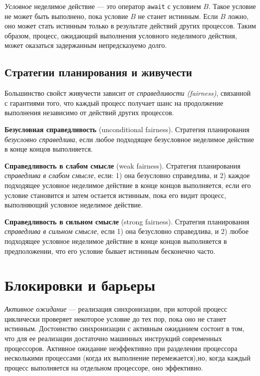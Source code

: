 \emph{Условное} неделимое действие --- это оператор \texttt{await} с условием
$B$. Такое условие не может быть выполнено, пока условие $B$ не станет
истинным. Если $B$ ложно, оно может стать истинным только в результате действий
других процессов. Таким образом, процесс, ожидающий выполнения условного
неделимого действия, может оказаться задержанным непредсказуемо долго.



\subsection{Стратегии планирования и живучести}

Большинство свойст живучести зависит от \emph{справедливости (fairness)},
связанной с гарантиями того, что каждый процесс получает шанс на продолжение
выполнения независимо от действий других процессов.

\textbf{Безусловная справедливость} (unconditional fairness). Стратегия
планирования \emph{безусловно справедлива}, если любое подходящее безусловное
неделимое действие в конце концов выполняется.

\textbf{Справедливость в слабом смысле} (weak fairness). Стратегия планирования
\emph{справедлива в слабом смысле}, если: 1) она безусловно справедлива, и
2) каждое подходящее условное неделимое действие в конце концов выполняется,
если его условие становится и затем остается истинным, пока его видит процесс,
выполняющий условное неделимое действие.

\textbf{Справедливость в сильном смысле} (strong fairness). Стратегия
планирования \emph{справедлива в сильном смысле}, если 1) она безусловно
справедлива, и 2) любое подходящее условное неделимое действие в конце концов
выполняется в предположении, что его условие бывает истинным бесконечно часто.





\section{Блокировки и барьеры}

\emph{Активное ожидание} --- реализация синхронизации, при которой процесс
циклически проверяет некоторое условие до тех пор, пока оно не станет
истинным. Достоинство синхронизации с активным ожиданием состоит в том, что для
ее реализации достаточно машинных инструкций современных процессоров. Активное
ожидание неэффективно при разделении процессора несколькими процессами (когда их
выполнение перемежается),но, когда каждый процесс выполняется на отдельном
процессоре, оно эффективно.


